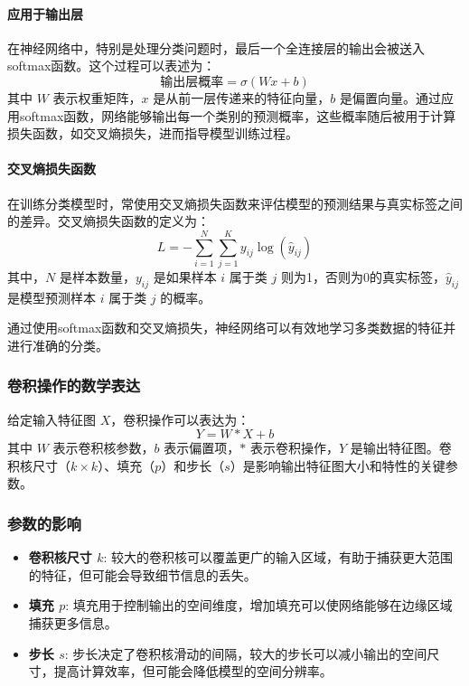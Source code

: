 \documentclass[a4paper,12pt]{article}
\begin{document}
\paragraph{应用于输出层}
在神经网络中，特别是处理分类问题时，最后一个全连接层的输出会被送入softmax函数。这个过程可以表述为：
\[
\text{输出层概率} = \sigma(Wx + b)
\]
其中 \( W \) 表示权重矩阵，\( x \) 是从前一层传递来的特征向量，\( b \) 是偏置向量。通过应用softmax函数，网络能够输出每一个类别的预测概率，这些概率随后被用于计算损失函数，如交叉熵损失，进而指导模型训练过程。

\paragraph{交叉熵损失函数}
在训练分类模型时，常使用交叉熵损失函数来评估模型的预测结果与真实标签之间的差异。交叉熵损失函数的定义为：
\[
L = -\sum_{i=1}^N \sum_{j=1}^K y_{ij} \log(\hat{y}_{ij})
\]
其中，\( N \) 是样本数量，\( y_{ij} \) 是如果样本 \( i \) 属于类 \( j \) 则为1，否则为0的真实标签，\( \hat{y}_{ij} \) 是模型预测样本 \( i \) 属于类 \( j \) 的概率。

通过使用softmax函数和交叉熵损失，神经网络可以有效地学习多类数据的特征并进行准确的分类。

\subsubsection{卷积操作的数学表达}
给定输入特征图 \(X\)，卷积操作可以表达为：
\[
Y = W \ast X + b
\]
其中 \(W\) 表示卷积核参数，\(b\) 表示偏置项，\(\ast\) 表示卷积操作，\(Y\) 是输出特征图。卷积核尺寸（\(k \times k\)）、填充（\(p\)）和步长（\(s\)）是影响输出特征图大小和特性的关键参数。

\subsubsection{参数的影响}
\begin{itemize}
	\item \textbf{卷积核尺寸 \(k\)}: 较大的卷积核可以覆盖更广的输入区域，有助于捕获更大范围的特征，但可能会导致细节信息的丢失。
	\item \textbf{填充 \(p\)}: 填充用于控制输出的空间维度，增加填充可以使网络能够在边缘区域捕获更多信息。
	\item \textbf{步长 \(s\)}: 步长决定了卷积核滑动的间隔，较大的步长可以减小输出的空间尺寸，提高计算效率，但可能会降低模型的空间分辨率。
\end{itemize}
\end{document}
